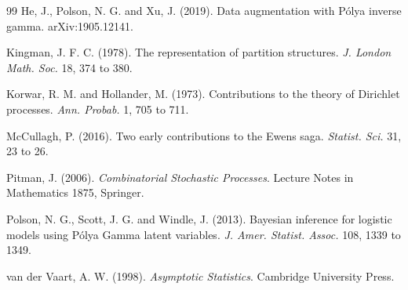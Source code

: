 \begin{thebibliography}{99}
He, J., Polson, N. G. and Xu, J. (2019). Data augmentation with P\'olya inverse gamma. arXiv:1905.12141.

Kingman, J. F. C. (1978). The representation of partition structures. \emph{J. London Math. Soc.} 18, 374 to 380.

Korwar, R. M. and Hollander, M. (1973). Contributions to the theory of Dirichlet processes. \emph{Ann. Probab.} 1, 705 to 711.

McCullagh, P. (2016). Two early contributions to the Ewens saga. \emph{Statist. Sci.} 31, 23 to 26.

Pitman, J. (2006). \emph{Combinatorial Stochastic Processes}. Lecture Notes in Mathematics 1875, Springer.

Polson, N. G., Scott, J. G. and Windle, J. (2013). Bayesian inference for logistic models using P\'olya Gamma latent variables. \emph{J. Amer. Statist. Assoc.} 108, 1339 to 1349.

van der Vaart, A. W. (1998). \emph{Asymptotic Statistics}. Cambridge University Press.

\end{thebibliography}
